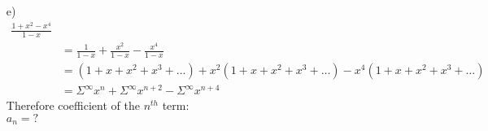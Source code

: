 \documentclass{article}
\begin{document}
{\begin{enumerate}[label=\alph*]
{            Substituting $-x$ for $x$,
            \begin{equation}
                \frac{1}{1+x} = 1-x+x^2-x^3+\dots
            \end{equation}

            Differentiating (2) w.r.t $x$,
            \begin{align*}
                \frac{d}{dx} (\frac{1}{1+x})
                & = \frac{-1}{(1+x)^2}\\
                & = -1+2x-3x^2+\dots
            \end{align*}
            \begin{equation}
                \therefore \frac{1}{(1+x)^2} 
                = 1-2x+3x^2-\dots\\
            \end{equation}

            \begin{align*}
                \frac{1}{1-x^4}
                & = \frac{1}{4} (1+x+x^2+x^3+\dots)
                + \frac{1}{4} (1-x+x^2-x^3+\dots)
                + \frac{1}{2} (1-2x+3x^2-\dots)\\
                & = \frac{1}{4} (2+2x^2+2x^4+\dots)
                + \frac{1}{2} (1-2x+3x^2-\dots)\\
                & = \frac{1}{2} (1+x^2+x^4+\dots)
                + \frac{1}{2} (1-2x+3x^2-\dots)\\
                & = \frac{1}{2} (2-2x+4x^2-4x^3+6x^4-\dots)\\
                & = 1-x+2x^2-2x^3+3x^4-\dots\\
                & = \Sigma_{n=0}^{\infty}
                    (-1)^n (n+\frac{1+(-1)^n}{2})) x^n\\
                & = \Sigma_{n=0}^{\infty}
                    (-1)^n \frac{2n+1+(-1)^n}{2} x^n
            \end{align*}
            Therefore coefficient of the $n^{th}$ term:\\

            $\boxed{a_n = (-1)^n \frac{2n+1+(-1)^n}{2} }$\\
            }
        \item[e)]{
            \begin{align*}
                \frac{1+x^2-x^4}{1-x}\\
                & = \frac{1}{1-x} + \frac{x^2}{1-x} - \frac{x^4}{1-x}\\
                & = (1+x+x^2+x^3+\dots)
                + x^2(1+x+x^2+x^3+\dots)
                - x^4(1+x+x^2+x^3+\dots)\\
                & = \Sigma^{\infty} x^n
                + \Sigma^{\infty} x^{n+2}
                - \Sigma^{\infty} x^{n+4}
            \end{align*}
            Therefore coefficient of the $n^{th}$ term:\\

            $\boxed{a_n =  ?}$\\
        }
    \end{enumerate}
    }
\end{document}

